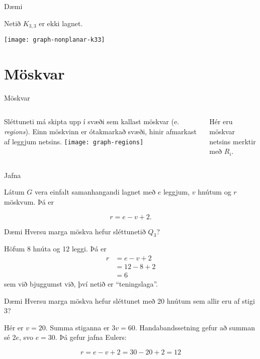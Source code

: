 \documentclass[handout]{beamer}
\begin{document}
\begin{frame}{Dæmi}
\begin{center}
Netið $K_{3,3}$ er ekki lagnet.

\texttt{[image: graph-nonplanar-k33]}
\end{center}
\end{frame}

\section{Möskvar}

\begin{frame}{Möskvar}
\begin{columns}
Sléttuneti má skipta upp í svæði sem kallast möskvar (e. \emph{regions}). Einn möskvinn er ótakmarkað svæði, hinir afmarkast af leggjum netsins.
\texttt{[image: graph-regions]}

Hér eru möskvar netsins merktir með $R_i$.
\end{columns}
\end{frame}

\begin{frame}{Jafna}
\begin{tcolorbox}[title=Jafna Eulers]
Látum $G$ vera einfalt samanhangandi lagnet með $e$ leggjum, $v$ hnútum og $r$ möskvum. Þá er

\[
 r = e - v + 2.
\]

\end{tcolorbox}
\end{frame}

\begin{frame}{Dæmi}
    Hversu marga möskva hefur sléttunetið $Q_3$?

    \pause

    Höfum 8 hnúta og 12 leggi. Þá er 
    \begin{align*}
        r &= e - v + 2\\
          &= 12 - 8 + 2\\
          &= 6
    \end{align*}
    sem við bjuggumst við, því netið er ``teningslaga''.
\end{frame}

\begin{frame}{Dæmi}
Hversu marga möskva hefur sléttunet með 20 hnútum sem allir eru af stigi 3?
\pause

\vspace{1cm}
Hér er $v=20$. Summa stiganna er $3v = 60$. Handabandssetning gefur að summan sé $2e$, svo $e = 30$. Þá gefur jafna Eulers:

\[
 r = e - v + 2 = 30 - 20 + 2 = 12
\]

\end{frame}
\end{document}
